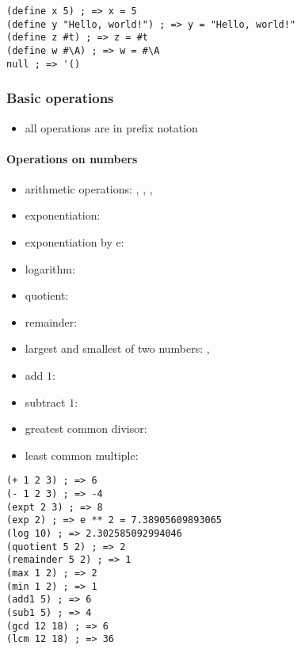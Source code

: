 \documentclass[a4paper,landscape,10pt]{article}
\begin{document}
\begin{multicols*}{2}
  \begin{lstlisting}[language=Racket]
(define x 5) ; => x = 5
(define y "Hello, world!") ; => y = "Hello, world!"
(define z #t) ; => z = #t
(define w #\A) ; => w = #\A
null ; => '()
\end{lstlisting}

  \subsubsection{Basic operations}

  \begin{itemize}
    \item all operations are in prefix notation 
  \end{itemize}

  \paragraph{Operations on numbers}

  \begin{itemize}
    \item arithmetic operations: \iracket{+}, \iracket{-}, \iracket{*}, \iracket{/}
    \item exponentiation: 
    \item exponentiation by e: 
    \item logarithm: 
    \item quotient: 
    \item remainder: 
    \item largest and smallest of two numbers: , 
    \item add \(1\): 
    \item subtract \(1\): 
    \item greatest common divisor: 
    \item least common multiple: 
  \end{itemize}

  \begin{lstlisting}[language=Racket]
(+ 1 2 3) ; => 6
(- 1 2 3) ; => -4
(expt 2 3) ; => 8
(exp 2) ; => e ** 2 = 7.38905609893065
(log 10) ; => 2.302585092994046
(quotient 5 2) ; => 2
(remainder 5 2) ; => 1
(max 1 2) ; => 2
(min 1 2) ; => 1
(add1 5) ; => 6
(sub1 5) ; => 4
(gcd 12 18) ; => 6
(lcm 12 18) ; => 36
\end{lstlisting}


\end{multicols*}
\end{document}
